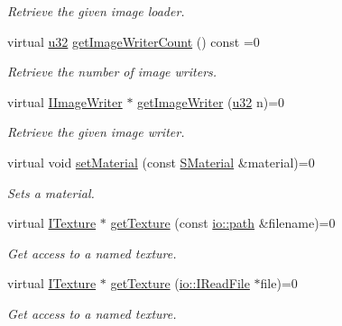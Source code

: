 \begin{DoxyCompactItemize}
\begin{DoxyCompactList}\small\item\em Retrieve the given image loader. \end{DoxyCompactList}\item 
virtual \hyperlink{namespaceirr_a0416a53257075833e7002efd0a18e804}{u32} \hyperlink{classirr_1_1video_1_1IVideoDriver_a173f33f0537a1511abdf35ed235a683a}{get\+Image\+Writer\+Count} () const =0
\begin{DoxyCompactList}\small\item\em Retrieve the number of image writers. \end{DoxyCompactList}\item 
virtual \hyperlink{classirr_1_1video_1_1IImageWriter}{I\+Image\+Writer} $\ast$ \hyperlink{classirr_1_1video_1_1IVideoDriver_acdc5e788993c117efebb22e155ab6a77}{get\+Image\+Writer} (\hyperlink{namespaceirr_a0416a53257075833e7002efd0a18e804}{u32} n)=0
\begin{DoxyCompactList}\small\item\em Retrieve the given image writer. \end{DoxyCompactList}\item 
virtual void \hyperlink{classirr_1_1video_1_1IVideoDriver_a8c9e31b41b7e6fd26cf65ce538ebab05}{set\+Material} (const \hyperlink{classirr_1_1video_1_1SMaterial}{S\+Material} \&material)=0
\begin{DoxyCompactList}\small\item\em Sets a material. \end{DoxyCompactList}\item 
virtual \hyperlink{classirr_1_1video_1_1ITexture}{I\+Texture} $\ast$ \hyperlink{classirr_1_1video_1_1IVideoDriver_af4055165190e4adf221c6dc6f2434ea0}{get\+Texture} (const \hyperlink{namespaceirr_1_1io_ab1bdc45edb3f94d8319c02bc0f840ee1}{io\+::path} \&filename)=0
\begin{DoxyCompactList}\small\item\em Get access to a named texture. \end{DoxyCompactList}\item 
virtual \hyperlink{classirr_1_1video_1_1ITexture}{I\+Texture} $\ast$ \hyperlink{classirr_1_1video_1_1IVideoDriver_aaf989c8688ffe2a28a4b8e7b6ec2bce7}{get\+Texture} (\hyperlink{classirr_1_1io_1_1IReadFile}{io\+::\+I\+Read\+File} $\ast$file)=0
\begin{DoxyCompactList}\small\item\em Get access to a named texture. \end{DoxyCompactList}\item 

\end{DoxyCompactItemize}
